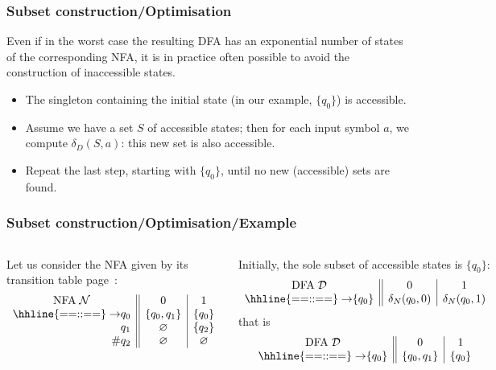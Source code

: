 %
\begin{frame}
\frametitle{Subset construction/Optimisation}

Even if in the worst case the resulting DFA has an exponential number
of states of the corresponding NFA, it is in practice often possible
to avoid the construction of inaccessible states.
\begin{itemize}

  \item The singleton containing the initial state (in our example,
  \(\{q_0\}\)) is accessible.

  \item Assume we have a set \(S\) of accessible states; then for
  each input symbol \(a\), we compute \(\delta_D(S,a)\): this new set
  is also accessible.

  \item Repeat the last step, starting with \(\{q_0\}\), until no
  new (accessible) sets are found.

\end{itemize}

\end{frame}

%
\begin{frame}
\frametitle{Subset construction/Optimisation/Example}

\begin{columns}

   Let us consider the NFA given by its
  transition table page~\pageref{nfa_01_suffix_table}:
  \[
  \begin{array}{r@{}l||c|c}
    \multicolumn{2}{c||}{\text{NFA} \; {\cal N}} & 0 & 1\\
    \hhline{==::==}
    \rightarrow & q_0 & \{q_0, q_1\} & \{q_0\}\\
                & q_1 & \varnothing  & \{q_2\}\\
    \#          & q_2 & \varnothing  & \varnothing
  \end{array}
  \]

   Initially, the sole subset of accessible
  states is \(\{q_0\}\):
  \[
  \begin{array}{r@{}l||c|c}
    \multicolumn{2}{c||}{\text{DFA} \; {\cal D}} & 0 & 1\\
    \hhline{==::==}
    \rightarrow & \{q_0\} & \delta_N(q_0,0) & \delta_N(q_0,1)
  \end{array}
  \]
  that is
  \[
  \begin{array}{r@{}l||c|c}
    \multicolumn{2}{c||}{\text{DFA} \; {\cal D}} & 0 & 1\\
    \hhline{==::==}
    \rightarrow & \{q_0\} & \{q_0,q_1\} & \{q_0\}
  \end{array}
  \]
\end{columns}

\end{frame}

